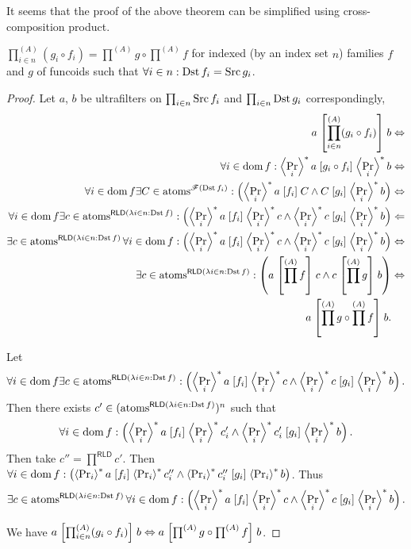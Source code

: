 \begin{rem}
It seems that the proof of the above theorem can be simplified using
cross-composition product.\end{rem}
\begin{thm}
$\prod_{i\in n}^{(A)}(g_{i}\circ f_{i})=\prod^{(A)}g\circ\prod^{(A)}f$
for indexed (by an index set $n$) families $f$ and $g$ of funcoids
such that $\forall i\in n:\Dst f_{i}=\Src g_{i}$.\end{thm}
\begin{proof}
Let $a$, $b$ be ultrafilters on $\prod_{i\in n}\Src f_{i}$ and
$\prod_{i\in n}\Dst g_{i}$ correspondingly,
\begin{align*}
a\suprel{\prod_{i\in n}^{(A)}(g_{i}\circ f_{i})}b & \Leftrightarrow\\
\forall i\in\dom f:\rsupfun{\Pr_{i}}a\suprel{g_{i}\circ f_{i}}\rsupfun{\Pr_{i}}b & \Leftrightarrow\\
\forall i\in\dom f\exists C\in\atoms^{\mathscr{F}(\Dst f_{i})}:\left(\rsupfun{\Pr_{i}}a\suprel{f_{i}}C\land C\suprel{g_{i}}\rsupfun{\Pr_{i}}b\right) & \Leftrightarrow\\
\forall i\in\dom f\exists c\in\atoms^{\mathsf{RLD}(\mylamdba in{\Dst f})}:\left(\rsupfun{\Pr_{i}}a\suprel{f_{i}}\rsupfun{\Pr_{i}}c\land\rsupfun{\Pr_{i}}c\suprel{g_{i}}\rsupfun{\Pr_{i}}b\right) & \Leftarrow\\
\exists c\in\atoms^{\mathsf{RLD}(\mylamdba in{\Dst f})}\forall i\in\dom f:\left(\rsupfun{\Pr_{i}}a\suprel{f_{i}}\rsupfun{\Pr_{i}}c\land\rsupfun{\Pr_{i}}c\suprel{g_{i}}\rsupfun{\Pr_{i}}b\right) & \Leftrightarrow\\
\exists c\in\atoms^{\mathsf{RLD}(\mylamdba in{\Dst f})}:\left(a\suprel{\prod^{(A)}f}c\land c\suprel{\prod^{(A)}g}b\right) & \Leftrightarrow\\
a\suprel{\prod^{(A)}g\circ\prod^{(A)}f}b.
\end{align*}


Let 
\[
\forall i\in\dom f\exists c\in\atoms^{\mathsf{RLD}(\mylamdba in{\Dst f})}:\left(\rsupfun{\Pr_{i}}a\suprel{f_{i}}\rsupfun{\Pr_{i}}c\land\rsupfun{\Pr_{i}}c\suprel{g_{i}}\rsupfun{\Pr_{i}}b\right).
\]
Then there exists $c'\in(\atoms^{\mathsf{RLD}(\lambda i\in n:\Dst f)})^{n}$
such that
\[
\forall i\in\dom f:\left(\rsupfun{\Pr_{i}}a\suprel{f_{i}}\rsupfun{\Pr_{i}}c'_{i}\land\rsupfun{\Pr_{i}}c'_{i}\suprel{g_{i}}\rsupfun{\Pr_{i}}b\right).
\]
Then take $c''=\prod^{\mathsf{RLD}}c'$. Then $\forall i\in\dom f:\left(\rsupfun{\Pr_{i}}a\suprel{f_{i}}\rsupfun{\Pr_{i}}c''_{i}\wedge\rsupfun{\Pr_{i}}c''_{i}\suprel{g_{i}}\rsupfun{\Pr_{i}}b\right)$.
Thus 
\[
\exists c\in\atoms^{\mathsf{RLD}(\lambda i\in n:\Dst f)}\forall i\in\dom f:\left(\rsupfun{\Pr_{i}}a\suprel{f_{i}}\rsupfun{\Pr_{i}}c\wedge\rsupfun{\Pr_{i}}c\suprel{g_{i}}\rsupfun{\Pr_{i}}b\right).
\]


We have $a\suprel{\prod_{i\in n}^{(A)}(g_{i}\circ f_{i})}b\Leftrightarrow a\suprel{\prod^{(A)}g\circ\prod^{(A)}f}b$.\end{proof}
